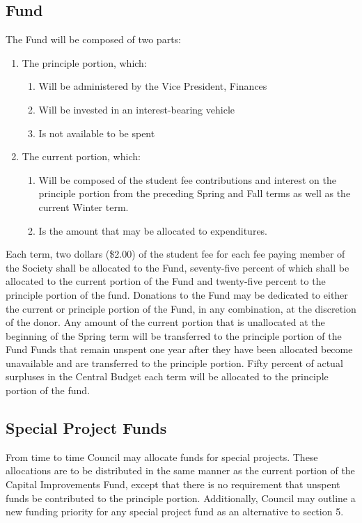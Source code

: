 \subsection{Fund}
The Fund will be composed of two parts:
\begin{enumerate}
\item The principle portion, which:
	\begin{enumerate}
	\item Will be administered by the Vice President, Finances
	\item Will be invested in an interest-bearing vehicle
	\item Is not available to be spent 
	\end{enumerate}
\item The current portion, which:
	\begin{enumerate}
	\item Will be composed of the student fee contributions and interest on the principle portion from the preceding Spring and Fall terms as well as the current Winter term. 
	\item Is the amount that may be allocated to expenditures. 
	\end{enumerate}
\end{enumerate}
Each term, two dollars (\$2.00) of the student fee for each fee paying member of the Society shall be allocated to the Fund, seventy-five percent of which shall be allocated to the current portion of the Fund and twenty-five percent to the principle portion of the fund.
Donations to the Fund may be dedicated to either the current or principle portion of the Fund, in any combination, at the discretion of the donor.
Any amount of the current portion that is unallocated at the beginning of the Spring term will be transferred to the principle portion of the Fund
Funds that remain unspent one year after they have been allocated become unavailable and are transferred to the principle portion.
Fifty percent of actual surpluses in the Central Budget each term will be allocated to the principle portion of the fund.

\subsection{Special Project Funds}
From time to time Council may allocate funds for special projects. These allocations are to be distributed in the same manner as the current portion of the Capital Improvements Fund, except that there is no requirement that unspent funds be contributed to the principle portion.
Additionally, Council may outline a new funding priority for any special project fund as an alternative to section 5.

